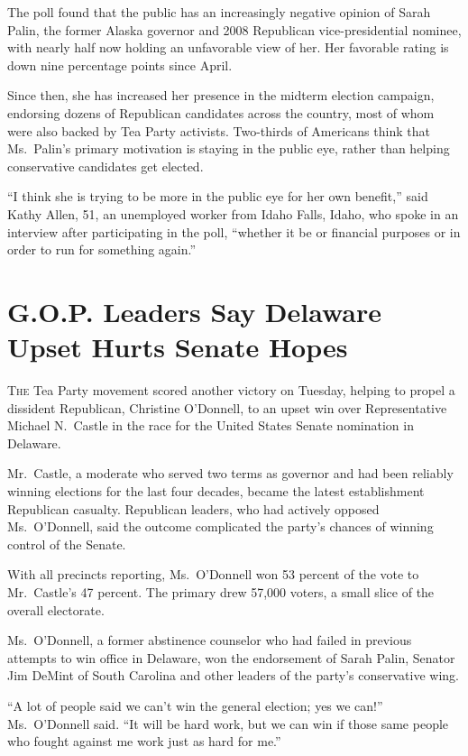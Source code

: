 ﻿\documentclass[12pt]{article}
\begin{document}
The poll found that the public has an increasingly negative opinion of Sarah Palin, the former
Alaska governor and 2008 Republican vice-presidential nominee, with nearly half now holding an
unfavorable view of her. Her favorable rating is down nine percentage points since April.

Since then, she has increased her presence in the midterm election campaign, endorsing dozens of
Republican candidates across the country, most of whom were also backed by Tea Party activists.
Two-thirds of Americans think that Ms.~Palin's primary motivation is staying in the public eye,
rather than helping conservative candidates get elected.

``I think she is trying to be more in the public eye for her own benefit,'' said Kathy Allen, 51, an
unemployed worker from Idaho Falls, Idaho, who spoke in an interview after participating in the
poll, ``whether it be or financial purposes or in order to run for something again.''

\pagebreak
\section{G.O.P. Leaders Say Delaware Upset Hurts Senate Hopes}

\lettrine{T}{he} Tea Party movement scored another victory on Tuesday,
helping to propel a dissident Republican, Christine O'Donnell, to an upset win over Representative
Michael N.~Castle in the race for the United States Senate nomination in Delaware.

Mr.~Castle, a moderate who served two terms as governor and had been reliably winning elections for
the last four decades, became the latest establishment Republican casualty. Republican leaders, who
had actively opposed Ms.~O'Donnell, said the outcome complicated the party's chances of winning
control of the Senate.

With all precincts reporting, Ms.~O'Donnell won 53 percent of the vote to Mr.~Castle's 47 percent.
The primary drew 57,000 voters, a small slice of the overall electorate.

Ms.~O'Donnell, a former abstinence counselor who had failed in previous attempts to win office in
Delaware, won the endorsement of Sarah Palin, Senator Jim DeMint of South Carolina and other leaders
of the party's conservative wing.

``A lot of people said we can't win the general election; yes we can!'' Ms.~O'Donnell said. ``It
will be hard work, but we can win if those same people who fought against me work just as hard for
me.''
\end{document}
